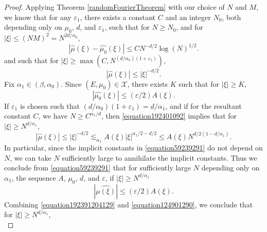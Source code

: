 \documentclass[12pt,reqno]{article}
\begin{document}
\begin{proof}
    Applying Theorem \ref{randomFourierTheorem} with our choice of $N$ and $M$, we know that for any $\varepsilon_1$, there exists a constant $C$ and an integer $N_0$, both depending only on $\mu_0$, $d$, and $\varepsilon_1$, such that for $N \geq N_0$, and for $|\xi| \leq (NM)^2 = N^{2d/\alpha_0}$,
    \begin{equation} \label{equation1092490129012}
        |\widehat{\mu}(\xi) - \widehat{\mu_0}(\xi)| \leq C N^{-d/2} \log(N)^{1/2}.
    \end{equation}
    and such that for $|\xi| \geq \max(C,N^{(d/\alpha_0)(1 + \varepsilon_1)})$,
    \begin{equation} \label{equation192401092}
        |\widehat{\mu}(\xi)| \leq |\xi|^{-d/2}.
    \end{equation}
    Fix $\alpha_1 \in (\beta,\alpha_0)$. Since $(E,\mu_0) \in \mathcal{X}$, there exists $K$ such that for $|\xi| \geq K$,
    \begin{equation} \label{equation192391204129}
        |\widehat{\mu_0}(\xi)| \leq (\varepsilon/2) A(\xi).
    \end{equation}
    If $\varepsilon_1$ is chosen such that $(d/\alpha_0)(1 + \varepsilon_1) = d/\alpha_1$, and if for the resultant constant $C$, we have $N \geq C^{\alpha_1/d}$, then \eqref{equation192401092} implies that for $|\xi| \geq N^{d/\alpha_1}$,
    \begin{equation} \label{equation59239291}
        |\widehat{\mu}(\xi)| \leq |\xi|^{-d/2} \lesssim_{\alpha_1} A(\xi) |\xi|^{\alpha_1/2-d/2} \leq A(\xi) N^{d/2(1 - d/\alpha_1)}.
    \end{equation}
    In particular, since the implicit constants in \eqref{equation59239291} do not depend on $N$, we can take $N$ sufficiently large to annihilate the implicit constants. Thus we conclude from \eqref{equation59239291} that for sufficiently large $N$ depending only on $\alpha_1$, the sequence $A$, $\mu_0$, $d$, and $\varepsilon$, if $|\xi| \geq N^{d/\alpha_1}$
    \begin{equation} \label{equation124901290}
        |\widehat{\mu(\xi)}| \leq (\varepsilon/2) A(\xi).
    \end{equation}
    Combining \eqref{equation192391204129} and \eqref{equation124901290}, we conclude that for $|\xi| \geq N^{d/\alpha_1}$,
    \begin{equation} \label{equation129012904}

\end{equation}
\end{proof}
\end{document}
